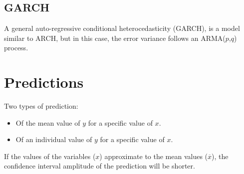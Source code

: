 \documentclass[10pt, a4paper, landscape]{extarticle}
\begin{document}
\begin{multicols}{3}
	\subsection*{GARCH}
		A general auto-regressive conditional heterocedasticity (GARCH), is a model similar to ARCH, but in this case, the error variance follows an ARMA($p$,$q$) process.

\section*{Predictions}
	Two types of prediction:
	\begin{itemize}[leftmargin=*]
		\item Of the mean value of $y$ for a specific value of $x$.
		\item Of an individual value of $y$ for a specific value of $x$.
	\end{itemize}
	If the values of the variables ($x$) approximate to the mean values ($\overline{x}$), the confidence interval amplitude of the prediction will be shorter. 
\end{multicols}
\end{document}
